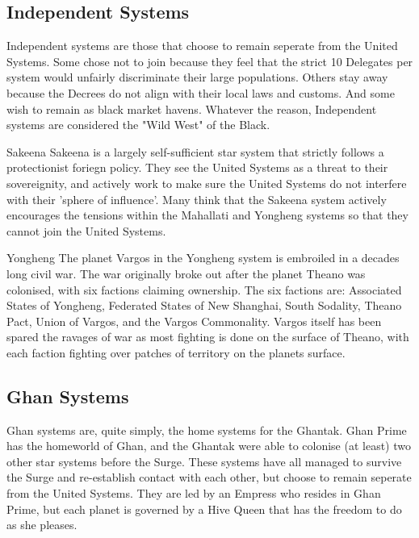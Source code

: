 \begin{multicols}{2}
  \subsection{Independent Systems}

  Independent systems are those that choose to remain seperate from the United Systems. Some chose not to join because they feel that the strict 10 Delegates per system would unfairly discriminate their large populations. Others stay away because the Decrees do not align with their local laws and customs. And some wish to remain as black market havens. Whatever the reason, Independent systems are considered the "Wild West" of the Black.
  
  \begin{genericsection}{Sakeena}
  Sakeena is a largely self-sufficient star system that strictly follows a protectionist foriegn policy. They see the United Systems as a threat to their sovereignity, and actively work to make sure the United Systems do not interfere with their 'sphere of influence'. Many think that the Sakeena system actively encourages the tensions within the Mahallati and Yongheng systems so that they cannot join the United Systems.
  \end{genericsection}
  
  \begin{genericsection}{Yongheng}
  The planet Vargos in the Yongheng system is embroiled in a decades long civil war. The war originally broke out after the planet Theano was colonised, with six factions claiming ownership. The six factions are: Associated States of Yongheng, Federated States of New Shanghai, South Sodality, Theano Pact, Union of Vargos, and the Vargos Commonality. Vargos itself has been spared the ravages of war as most fighting is done on the surface of Theano, with each faction fighting over patches of territory on the planets surface.
  \end{genericsection}

  \subsection{Ghan Systems}
  
  Ghan systems are, quite simply, the home systems for the Ghantak. Ghan Prime has the homeworld of Ghan, and the Ghantak were able to colonise (at least) two other star systems before the Surge. These systems have all managed to survive the Surge and re-establish contact with each other, but choose to remain seperate from the United Systems. They are led by an Empress who resides in Ghan Prime, but each planet is governed by a Hive Queen that has the freedom to do as she pleases.


\end{multicols}
